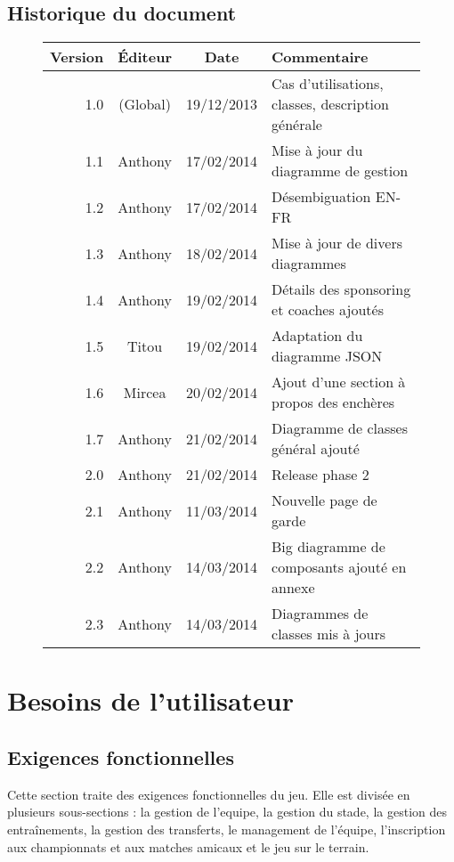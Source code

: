 \documentclass[a4paper, 11pt]{report}
\begin{document}
\section{Historique du document}
\begin{figure}[h!]
\centering
\begin{tabular}{| r | c | c | l |}
\hline
\textbf{Version} & \textbf{Éditeur} & \textbf{Date} & \textbf{Commentaire} \\
\hline
1.0 & (Global) & 19/12/2013 & Cas d'utilisations, classes, description générale\\
\hline
1.1 & Anthony & 17/02/2014 & Mise à jour du diagramme de gestion\\
\hline
1.2 & Anthony & 17/02/2014 & Désembiguation EN-FR\\
\hline
1.3 & Anthony & 18/02/2014 & Mise à jour de divers diagrammes\\
\hline
1.4 & Anthony & 19/02/2014 & Détails des sponsoring et coaches ajoutés\\
\hline
1.5 & Titou & 19/02/2014 & Adaptation du diagramme JSON\\
\hline
1.6 & Mircea & 20/02/2014 & Ajout d'une section à propos des enchères\\
\hline
1.7 & Anthony & 21/02/2014 & Diagramme de classes général ajouté\\
\hline
2.0 & Anthony & 21/02/2014 & Release phase 2\\
\hline
2.1 & Anthony & 11/03/2014 & Nouvelle page de garde\\
\hline
2.2 & Anthony & 14/03/2014 & Big diagramme de composants ajouté en annexe\\
\hline
2.3 & Anthony & 14/03/2014 & Diagrammes de classes mis à jours\\
\hline
\end{tabular}
\end{figure}

\renewcommand*{\glossaryname}{\section{Glossaire}}
\glsaddall
\printglossaries

\chapter{Besoins de l'utilisateur}

\section{Exigences fonctionnelles}
Cette section traite des exigences fonctionnelles du jeu. Elle est divisée en 
plusieurs sous-sections : la gestion de l'\gls{equipe}, la gestion du 
stade, la gestion des entraînements, la gestion des transferts, le management de l'équipe, l'inscription aux championnats et aux matches amicaux et le jeu sur le terrain.
\end{document}

